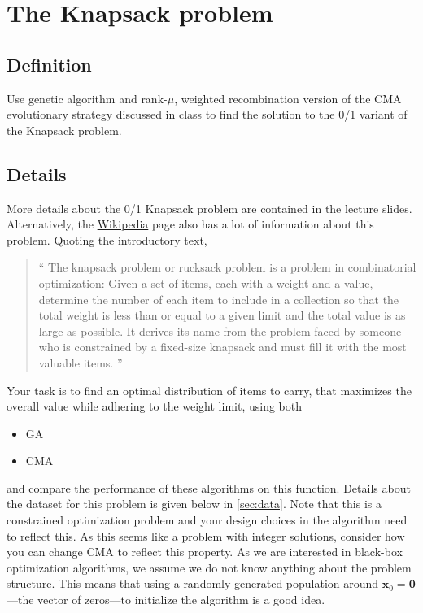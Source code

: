 \documentclass[11pt]{article}
\begin{document}
\section{The Knapsack problem}
\label{sec:org8b7e38d}
\subsection{Definition}
\label{sec:orgc4d8d97}
  Use genetic algorithm and rank-\(\mu\), weighted recombination version of the CMA
evolutionary strategy discussed in class to find the solution to the 0/1 variant of
the Knapsack problem.
\subsection{Details}
\label{sec:org61d4e22}
More details about the 0/1 Knapsack problem are contained in the lecture slides.
Alternatively, the \href{https://en.wikipedia.org/wiki/Knapsack\_problem}{Wikipedia} page also has a lot of information about this
problem. Quoting the introductory text,
\begin{quote}
`` The knapsack problem or rucksack problem is a problem in combinatorial
optimization: Given a set of items, each with a weight and a value, determine
the number of each item to include in a collection so that the total weight is
less than or equal to a given limit and the total value is as large as possible.
It derives its name from the problem faced by someone who is constrained by a
fixed-size knapsack and must fill it with the most valuable items. ''
\end{quote}

Your task is to find an optimal distribution of items to carry, that
maximizes the overall value while adhering to the weight limit, using both
\begin{itemize}
\item GA
\item CMA
\end{itemize}
and compare the performance of these algorithms on this function. Details about
the dataset for this problem is given below in \cref{sec:data}. Note that this is a constrained
optimization problem and your design choices in the
algorithm need to reflect this. As this seems like a problem with integer
solutions, consider how you can change CMA to reflect this property. As we are
interested in black-box optimization algorithms, we assume we do not know
anything about the problem structure. This means that using a randomly generated
population around \(\mathbf{x}_0 =\mathbf{0}\)---the vector of zeros---to
initialize the algorithm is a good idea.
\end{document}
